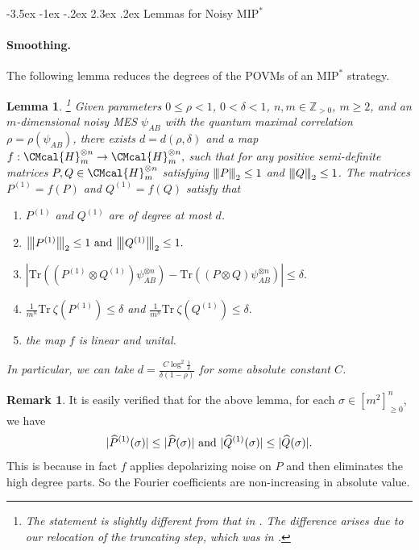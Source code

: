 \documentclass[11pt]{article}
\makeatletter
\renewcommand{\section}{\@startsection {section}{1}{\z@}%
             {-3.5ex \@plus -1ex \@minus -.2ex}%
             {2.3ex \@plus .2ex}%
             {\normalfont\Large\scshape\bfseries}}
\def\H{\CMcal{H}}
\theoremstyle{plain}
\newtheorem{lemma}[theorem]{Lemma}
\theoremstyle{definition}
\newtheorem{remark}[theorem]{Remark}
\newcommand {\br} [1] {\ensuremath{ \left( #1 \right) }}
\newcommand {\ab} [1] {\ensuremath{ \left| #1 \right| }}
\DeclarePairedDelimiter{\abs}{\lvert}{\rvert}
\newcommand{\nnorm}[1]{{\left\vert\kern-0.25ex\left\vert\kern-0.25ex\left\vert #1
		\right\vert\kern-0.25ex\right\vert\kern-0.25ex\right\vert}}
\newcommand {\Tr} {\ensuremath{ \mathrm{Tr} }}
\newcommand{\posint}{{\mathbb Z}_{>0}}
\newcommand{\1}{\mathbb{1}} %
\newcommand{\MIP}{\mathrm{MIP}}
\makeatother
\begin{document}
%
\section{Lemmas for Noisy \texorpdfstring{$\mathrm{MIP}^\ast$}{MIP*}}
\paragraph*{Smoothing.} The following lemma reduces the degrees of the POVMs of an $\MIP^\ast$ strategy.
\begin{lemma}\label{lem:smoothing of strategies}\cite[Lemma 6.1]{qin2021nonlocal}\footnote{The statement is slightly different from that in \cite[Lemma 6.1]{qin2021nonlocal}. The difference arises due to our relocation of the truncating step, which was in \cite[Lemma 10.5]{qin2021nonlocal}.}
	Given parameters $0\leq\rho<1$, $0<\delta<1$, $n,m\in\posint$, $m\geq2$, and an $m$-dimensional noisy MES $\psi_{AB}$  with the quantum maximal correlation $\rho=\rho\br{\psi_{AB}}$, there exists $d=d\br{\rho,\delta}$ and a map $f:\H_m^{\otimes n}\rightarrow \H_m^{\otimes n},$ such that for any positive semi-definite matrices $P, Q\in\H_m^{\otimes n}$ satisfying $\nnorm{P}_2\leq1$ and $\nnorm{Q}_2\leq1$. The matrices $P^{(1)}=f\br{P}$ and $Q^{(1)}=f\br{Q}$ satisfy that		
		\begin{enumerate}
						\item $P^{(1)}$ and $Q^{(1)}$ are of degree at most $d$.
			\item $\nnorm{P^{(1)}}_2\leq1~\mbox{and}~\nnorm{Q^{(1)}}_2\leq1.$

			\item $\ab{\Tr\br{\br{P^{(1)}\otimes Q^{(1)}}\psi^{\otimes n}_{AB}}-\Tr\br{\br{P\otimes Q}\psi^{\otimes n}_{AB}}}\leq\delta.$
		\item $\frac{1}{m^n}\Tr~\zeta(P^{(1)})\leq\delta $ and $\frac{1}{m^n}\Tr~\zeta(Q^{(1)})\leq\delta. $
            \item the map $f$ is linear and unital.
		\end{enumerate}
		In particular, we can take $d=\frac{C\log^2\frac{1}{\delta}}{\delta(1-\rho)}$ for some absolute constant $C$.
\end{lemma}
\begin{remark}
  It is easily verified that for the above lemma,
  for each $\sigma\in[m^2]^n_{\ge0}$, we have
  $$\abs{\widehat{P}^{(1)}(\sigma)}\le\abs{\widehat{P}(\sigma)}~\mbox{and}~\abs{\widehat{Q}^{(1)}(\sigma)}\le\abs{\widehat{Q}(\sigma)}.$$
  This is because in fact $f$ applies depolarizing noise on $P$ and then eliminates the high degree parts. So the Fourier coefficients are non-increasing in absolute value.
\end{remark}
\end{document}
